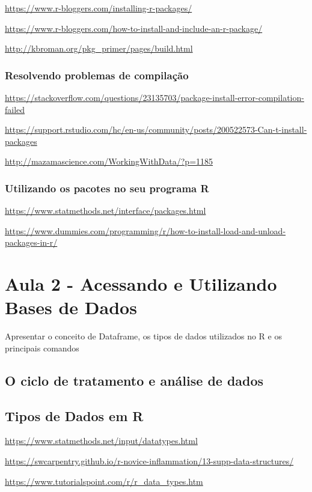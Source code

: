 \documentclass[12pt,a4paper,oneside]{erdc}\usepackage[]{graphicx}\usepackage[]{color}
\begin{document}
\url{https://www.r-bloggers.com/installing-r-packages/}

\url{https://www.r-bloggers.com/how-to-install-and-include-an-r-package/}

\url{http://kbroman.org/pkg_primer/pages/build.html}


\subsection{Resolvendo problemas de compilação}

\url{https://stackoverflow.com/questions/23135703/package-install-error-compilation-failed}

\url{https://support.rstudio.com/hc/en-us/community/posts/200522573-Can-t-install-packages}

\url{http://mazamascience.com/WorkingWithData/?p=1185}


\subsection{Utilizando os pacotes no seu programa R}

\url{https://www.statmethods.net/interface/packages.html}

\url{https://www.dummies.com/programming/r/how-to-install-load-and-unload-packages-in-r/}


		
\chapter{Aula 2 - Acessando e Utilizando Bases de Dados}

Apresentar o conceito de Dataframe, os tipos de dados utilizados no R e os principais comandos  

\section{O ciclo de tratamento e análise de dados}

\section{Tipos de Dados em R}

\url{https://www.statmethods.net/input/datatypes.html}

\url{https://swcarpentry.github.io/r-novice-inflammation/13-supp-data-structures/}

\url{https://www.tutorialspoint.com/r/r_data_types.htm}
\end{document}

